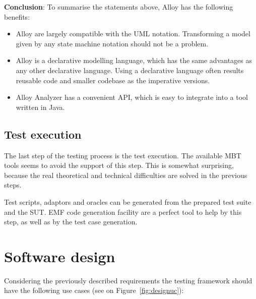 \textbf{Conclusion}: To summarise the statements above, Alloy has the following benefits:

\begin{itemize}
	\item Alloy are largely compatible with the UML notation. Transforming a model given by any state machine notation should not be a problem.
	\item Alloy is a declarative modelling language, which has the same advantages as any other declarative language. Using a declarative language often results reusable code and smaller codebase as the imperative versions.
	\item Alloy Analyzer has a convenient API, which is easy to integrate into a tool written in Java.
\end{itemize}



\subsection{Test execution}
\label{sub:designtestgeneration}

The last step of the testing process is the test execution. The available MBT tools seems to avoid the support of this step. This is somewhat surprising, because the real theoretical and technical difficulties are solved in the previous steps.

Test scripts, adaptors and oracles can be generated from the prepared test suite and the SUT. EMF code generation facility are a perfect tool to help by this step, as well as by the test case generation.



\section{Software design}
\label{sec:softwaredesign}

Considering the previously described requirements the testing framework should have the following use cases (see on Figure~\ref{fig:designuc}):

